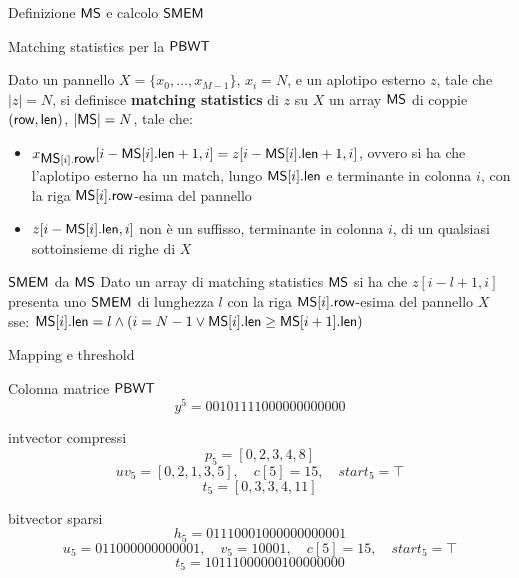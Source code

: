 \documentclass[]{beamer}
\def\len{\mbox{\rm {\sf len}}}
\def\row{\mbox{\rm {\sf row}}}
\def\MS{\mbox{\rm {\sf MS}}}
\def\PBWT{\mbox{\rm {\sf PBWT}}}
\def\SMEM{\mbox{\rm {\sf SMEM}}}
\begin{document}
\begin{frame}[plain]{Definizione $\MS$ e calcolo $\SMEM$}
  \begin{block}{Matching statistics per la $\PBWT$}
    {\small{
        Dato un pannello $X=\{x_0,\ldots,x_{M-1}\}$, $x_i=N$,
        e un aplotipo esterno $z$, tale che $|z|=N$, si definisce
        \textbf{matching
        statistics} di $z$ su $X$ un array $\MS$ di coppie $(\row,\len)$, 
        $|\MS|=N$, tale che:   
        \begin{itemize}
          \item $x_{\MS[i].\row}[i-\MS[i].\len+1,i]=z[i-\MS[i].\len+1,i]$, ovvero si
          ha che 
          l'aplotipo esterno ha un match, lungo $\MS[i].\len$ e terminante in colonna
          $i$, con la riga 
          $\MS[i].\row$-esima del pannello
          \item $z[i-\MS[i].\len,i]$ non è un suffisso,
          terminante in 
          colonna $i$,
          di un qualsiasi sottoinsieme di righe di $X$
        \end{itemize}
      }}
  \end{block}
  \pause
  \begin{block}{$\SMEM$ da $\MS$}
    {\small{
        Dato un array di matching statistics $\MS$ si ha che $z[i-l+1,i]$
        presenta uno $\SMEM$ di lunghezza $l$ con la riga $\MS[i].\row$-esima
        del 
        pannello $X$ sse: 
        $\MS[i].\len=l\land(i=N-1\lor \MS[i].\len\geq \MS[i+1].\len)$
      }}
  \end{block}
\end{frame}
\begin{frame}[plain]{Mapping e threshold}
  \begin{block}{Colonna matrice $\PBWT$}
    \[y^5=00101111000000000000\]
  \end{block}
  \begin{block}{intvector compressi}
    \[p_5=[0,2,3,4,8]\]
    \[uv_5=[0,2,1,3,5],\quad c[5]=15,\quad start_5=\top\]
    \[t_5=[0,3,3,4,11]\]
  \end{block}
  \begin{block}{bitvector sparsi}
    \[h_5=01110001000000000001\]
    \[u_5=011000000000001,\quad v_5=10001,\quad c[5]=15,\quad start_5=\top\]
    \[t_5=10111000000100000000\]
  \end{block}
\end{frame}
\end{document}
